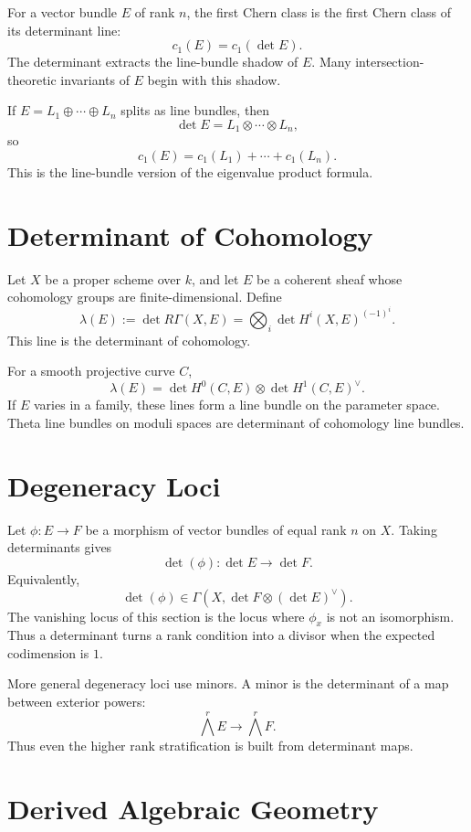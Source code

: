 \documentclass[11pt]{memoir}
\begin{document}
For a vector bundle \(E\) of rank \(n\), the first Chern class is the
first Chern class of its determinant line:
\[
  c_1(E)=c_1(\det E).
\]
The determinant extracts the line-bundle shadow of \(E\). Many
intersection-theoretic invariants of \(E\) begin with this shadow.

If \(E=L_1\oplus\cdots\oplus L_n\) splits as line bundles, then
\[
  \det E=L_1\otimes\cdots\otimes L_n,
\]
so
\[
  c_1(E)=c_1(L_1)+\cdots+c_1(L_n).
\]
This is the line-bundle version of the eigenvalue product formula.

\section{Determinant of Cohomology}
\label{sec:det-cohomology-ag}

Let \(X\) be a proper scheme over \(k\), and let \(E\) be a coherent
sheaf whose cohomology groups are finite-dimensional. Define
\[
  \lambda(E)
  :=
  \det R\Gamma(X,E)
  =
  \bigotimes_i \det H^i(X,E)^{(-1)^i}.
\]
This line is the determinant of cohomology.

For a smooth projective curve \(C\),
\[
  \lambda(E)=\det H^0(C,E)\otimes \det H^1(C,E)^\vee.
\]
If \(E\) varies in a family, these lines form a line bundle on the
parameter space. Theta line bundles on moduli spaces are determinant
of cohomology line bundles.

\section{Degeneracy Loci}
\label{sec:degeneracy}

Let \(\phi:E\to F\) be a morphism of vector bundles of equal rank
\(n\) on \(X\). Taking determinants gives
\[
  \det(\phi):\det E\to\det F.
\]
Equivalently,
\[
  \det(\phi)\in\Gamma(X,\det F\otimes(\det E)^\vee).
\]
The vanishing locus of this section is the locus where \(\phi_x\) is
not an isomorphism. Thus a determinant turns a rank condition into a
divisor when the expected codimension is \(1\).

More general degeneracy loci use minors. A minor is the determinant of
a map between exterior powers:
\[
  \bigwedge^r E\to \bigwedge^r F.
\]
Thus even the higher rank stratification is built from determinant
maps.

\section{Derived Algebraic Geometry}
\label{sec:derived-ag-det}
\end{document}
